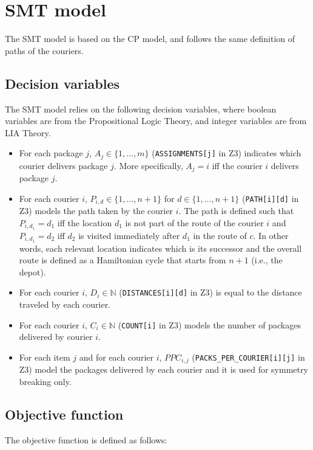 \section{SMT model}

The SMT model is based on the CP model, and follows the same definition of paths of the couriers. 

\subsection{Decision variables}

The SMT model relies on the following decision variables, where boolean variables are from the Propositional Logic Theory, and integer variables are from LIA Theory.

\begin{itemize}
    \item For each package $j$, $A_j \in \{1, \dots, m\}$ (\texttt{ASSIGNMENTS[j]} in Z3) indicates which courier delivers package $j$. More specifically, $A_j = i$ iff the courier $i$ delivers package $j$.
    
    \item For each courier $i$, $P_{i,d} \in \{1, \dots, n + 1\}$ for $d \in \{1, \dots, n + 1\}$ (\texttt{PATH[i][d]} in Z3) models the path taken by the courier $i$. The path is defined such that $P_{i, d_1} = d_1$ iff the location $d_1$ is not part of the route of the courier $i$ and $P_{i, d_1} = d_2$ iff $d_2$ is visited immediately after $d_1$ in the route of $c$. In other words, each relevant location indicates which is its successor and the overall route is defined as a Hamiltonian cycle that starts from $n+1$ (i.e., the depot).

    \item For each courier $i$, $D_i \in \mathbb{N}$ (\texttt{DISTANCES[i][d]} in Z3) is equal to the distance traveled by each courier.

    \item For each courier $i$, $C_i \in \mathbb{N}$ (\texttt{COUNT[i]} in Z3) models the number of packages delivered by courier $i$.

    \item For each item $j$ and for each courier $i$, $PPC_{i,j}$ (\texttt{PACKS\_PER\_COURIER[i][j]} in Z3) model the packages delivered by each courier and it is used for symmetry breaking only.
\end{itemize}

\subsection{Objective function}
The objective function is defined as follows:

